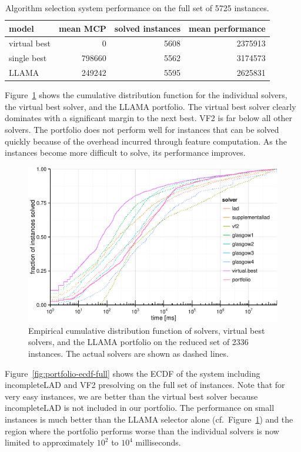 \documentclass{llncs}
\begin{document}
\begin{table}[ht]
\centering
\begin{tabular}{lrrr}
  \toprule
model & mean MCP & solved instances & mean performance\\
  \midrule
virtual best & 0 & 5608 & 2375913\\
single best & 798660 & 5562 & 3174573\\
LLAMA & 249242 & 5595 & 2625831\\
   \bottomrule
\end{tabular}
\vspace{1ex}
\caption{Algorithm selection system performance on the full set of 5725
instances.}\label{tab:resfull}
\end{table}

Figure~\ref{fig:portfolio-ecdf} shows the cumulative distribution function for
the individual solvers, the virtual best solver, and the LLAMA portfolio. The
virtual best solver clearly dominates with a significant margin to the next
best. VF2 is far below all other solvers. The portfolio does not perform well
for instances that can be solved quickly because of the overhead incurred
through feature computation. As the instances become more difficult to solve,
its performance improves.

\begin{figure}[!ht]
\includegraphics[width=\textwidth]{figures/portfolio-ecdf}
\caption{Empirical cumulative distribution function of solvers, virtual best
solvers, and the LLAMA portfolio on the reduced set of 2336 instances. The
actual solvers are shown as dashed lines.}
\label{fig:portfolio-ecdf}
\end{figure}

Figure~\ref{fig:portfolio-ecdf-full} shows the ECDF of the system including
incompleteLAD and VF2 presolving on the full set of instances. Note that for
very easy instances, we are better than the virtual best solver because
incompleteLAD is not included in our portfolio. The performance on small
instances is much better than the LLAMA selector alone (cf.\
Figure~\ref{fig:portfolio-ecdf}) and the region where the portfolio performs
worse than the individual solvers is now limited to approximately $10^2$ to
$10^4$ milliseconds.
\end{document}
